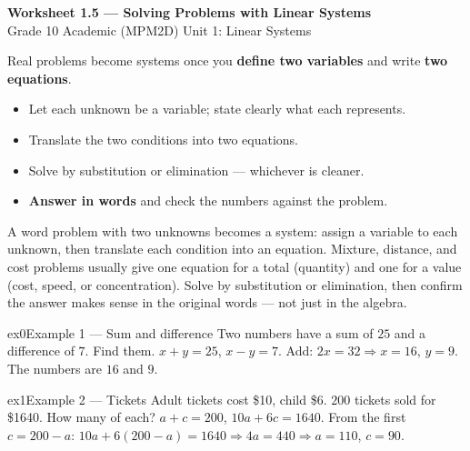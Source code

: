 \documentclass[11pt]{article}
\begin{document}
\begin{center}
{\LARGE\bfseries\color{titleblue}Worksheet 1.5 --- Solving Problems with Linear Systems}\\[2pt]
{\small Grade 10 Academic (MPM2D) \textperiodcentered{} Unit 1: Linear Systems}
\end{center}

\begin{ideabox}
Real problems become systems once you \textbf{define two variables} and write \textbf{two equations}.
\begin{itemize}[leftmargin=*,itemsep=2pt]
  \item Let each unknown be a variable; state clearly what each represents.
  \item Translate the two conditions into two equations.
  \item Solve by substitution or elimination --- whichever is cleaner.
  \item \textbf{Answer in words} and check the numbers against the problem.
\end{itemize}
\end{ideabox}

\begin{learnbox}
A word problem with two unknowns becomes a system: assign a variable to each unknown, then translate each condition into an equation.
Mixture, distance, and cost problems usually give one equation for a total (quantity) and one for a value (cost, speed, or concentration).
Solve by substitution or elimination, then confirm the answer makes sense in the original words — not just in the algebra.
\end{learnbox}


\begin{example}{ex0}{Example 1 --- Sum and difference}
Two numbers have a sum of $25$ and a difference of $7$. Find them.
\soln $x+y=25$, $x-y=7$. Add: $2x=32\Rightarrow x=16$, $y=9$. The numbers are $16$ and $9$.
\end{example}

\begin{example}{ex1}{Example 2 --- Tickets}
Adult tickets cost \$10, child \$6. $200$ tickets sold for \$1640. How many of each?
\soln $a+c=200$, $10a+6c=1640$. From the first $c=200-a$: $10a+6(200-a)=1640\Rightarrow 4a=440\Rightarrow a=110$, $c=90$.
\end{example}
\end{document}

